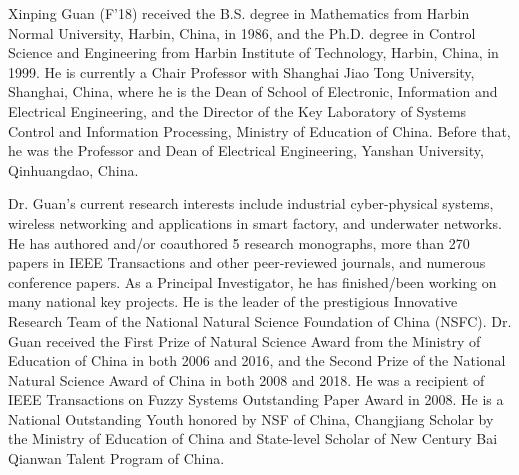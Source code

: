 \documentclass[12pt,journal,draftclsnofoot,onecolumn]{IEEEtran}
\begin{document}
\begin{IEEEbiographynophoto}{Xinping Guan}
(F'18) received the B.S. degree in Mathematics from Harbin Normal University, Harbin, China, in 1986, and the Ph.D. degree in Control Science and Engineering from Harbin Institute of Technology, Harbin, China, in 1999. He is currently a Chair Professor with Shanghai Jiao Tong University, Shanghai, China, where he is the Dean of School of Electronic, Information and Electrical Engineering, and the Director of the Key Laboratory of Systems Control and Information Processing, Ministry of Education of China. 
Before that, he was the Professor and Dean of Electrical Engineering, Yanshan University, Qinhuangdao, China. 

Dr. Guan's current research interests include industrial cyber-physical systems, wireless networking and applications in smart factory, and underwater networks. He has authored and/or coauthored 5 research monographs, more than 270 papers in IEEE Transactions and other peer-reviewed journals, and numerous conference papers. 
As a Principal Investigator, he has finished/been working on many national key projects. He is the leader of the prestigious Innovative Research Team of the National Natural Science Foundation of China (NSFC). 
Dr. Guan received the First Prize of Natural Science Award from the Ministry of Education of China in both 2006 and 2016, and the Second Prize of the National Natural Science Award of China in both 2008 and 2018. 
He was a recipient of IEEE Transactions on Fuzzy Systems Outstanding Paper Award in 2008. He is a National Outstanding Youth honored by NSF of China, Changjiang Scholar by the Ministry of Education of China and State-level Scholar of New Century Bai Qianwan Talent Program of China.
\end{IEEEbiographynophoto}
\end{document}
